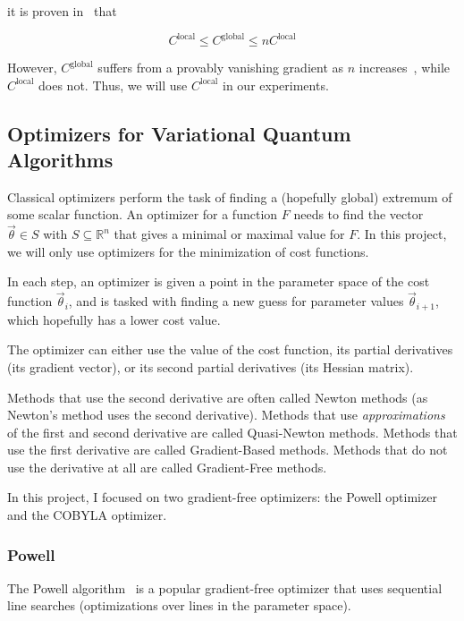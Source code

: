 \documentclass[a4paper,12pt]{article}
\newcommand{\thetas}{\vec{\theta}}
\begin{document}
it is proven in~\cite{sharma_noise_2020} that

\begin{equation}
    C^{\textrm{local}} \leq C^{\textrm{global}} \leq nC^{\textrm{local}}
\end{equation} 

However, $C^\textrm{global}$ suffers from a provably vanishing gradient as $n$ increases~\cite{cerezo_cost_2021}, while $C^\textrm{local}$ does not. Thus, we will use $C^\textrm{local}$ in our experiments.

\subsection{Optimizers for Variational Quantum Algorithms} \label{subsec:optimizers}
Classical optimizers perform the task of finding a (hopefully global) extremum of some scalar function.
An optimizer for a function $F$ needs to find the vector $\thetas \in S$ with $S \subseteq \mathbb{R}^n$ that gives a minimal or maximal value for $F$. In this project, we will only use optimizers for the minimization of cost functions.

In each step, an optimizer is given a point in the parameter space of the cost function $\thetas_{i}$, and is tasked with finding a new guess for parameter values $\thetas_{i+1}$, which hopefully has a lower cost value.

The optimizer can either use the value of the cost function, its partial derivatives (its gradient vector), or its second partial derivatives (its Hessian matrix).

Methods that use the second derivative are often called Newton methods (as Newton's method uses the second derivative). Methods that use \emph{approximations} of the first and second derivative are called Quasi-Newton methods.
Methods that use the first derivative are called Gradient-Based methods. Methods that do not use the derivative at all are called Gradient-Free methods.

In this project, I focused on two gradient-free optimizers: the Powell optimizer and the COBYLA optimizer.

\subsubsection{Powell}
The Powell algorithm~\cite{Powell1964} is a popular gradient-free optimizer that uses sequential line searches (optimizations over lines in the parameter space).
\end{document}
